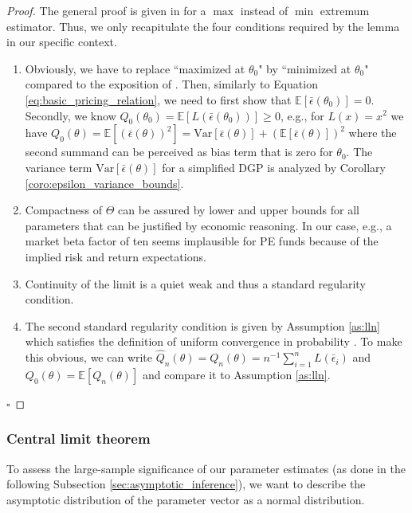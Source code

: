 \documentclass[12pt]{article}
\begin{document}
\begin{proof}
	The general proof is given in \cite[Chapter 2]{NM94} for a $\max$ instead of $\min$ extremum estimator.
	Thus, we only recapitulate the four conditions required by the lemma in our specific context.
	\begin{enumerate}
		\item 
		Obviously, we have to replace ``maximized at $\theta_0$" by ``minimized at $\theta_0$" compared to the exposition of \cite[Chapter 2]{NM94}.
		Then, similarly to Equation \ref{eq:basic_pricing_relation}, we need to first show that $\mathbb{E} \left[ \bar{\epsilon} (\theta_0) \right] = 0$.
		Secondly, we know $Q_0(\theta_0) = \mathbb{E} \left[ L \left( \bar{\epsilon} (\theta_0) \right) \right] \geq 0$, e.g., for $L(x)=x^2$ we have $Q_0(\theta) = \mathbb{E} \left[ \left( \bar{\epsilon} (\theta) \right)^2 \right] = \mathrm{Var} \left[ \bar{\epsilon} (\theta) \right] +  \left( \mathbb{E} \left[ \bar{\epsilon} (\theta) \right] \right)^2 $ where the second summand can be perceived as bias term that is zero for $\theta_0$.
		The variance term $\mathrm{Var} \left[ \bar{\epsilon} (\theta) \right]$ for a simplified DGP is analyzed by Corollary \ref{coro:epsilon_variance_bounds}.
		\item 
		Compactness of $\Theta$ can be assured by lower and upper bounds for all parameters that can be justified by economic reasoning. 
		In our case, e.g., a market beta factor of ten seems implausible for PE funds because of the implied risk and return expectations.
		\item 
		Continuity of the limit is a quiet weak and thus a standard regularity condition.
		\item 
		The second standard regularity condition is given by Assumption \ref{as:lln} which satisfies the definition of uniform convergence in probability \cite[Section 2.1]{NM94} . 
		To make this obvious, we can write $\hat{Q}_n(\theta) = Q_n(\theta) = n^{-1} \sum_{i=1}^n L \left( \bar{\epsilon}_i \right)$ and $Q_0(\theta) = \mathbb{E} \left[ Q_n(\theta) \right]$ and compare it to Assumption \ref{as:lln}.
	\end{enumerate}
	$\square$
\end{proof}


\subsubsection{Central limit theorem}

To assess the large-sample significance of our parameter estimates (as done in the following Subsection \ref{sec:asymptotic_inference}), we want to describe the asymptotic distribution of the parameter vector as a normal distribution.
\end{document}
